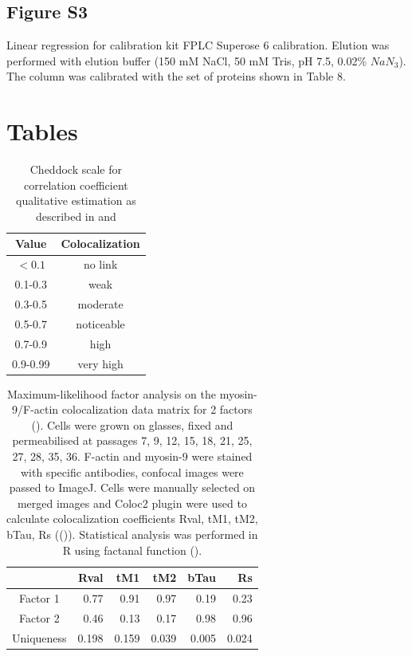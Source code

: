 \documentclass[alpha-refs]{wiley-article}
\begin{document}
\subsection*{Figure S3}

Linear regression for calibration kit FPLC Superose 6 calibration.
Elution was performed with elution buffer (150 mM NaCl, 50 mM Tris, pH 7.5, 0.02\% $NaN_3$).
The column was calibrated with the set of proteins shown in Table 8.



\section*{Tables}

\begin{table}[hb!]
  \caption{Cheddock scale for correlation coefficient qualitative estimation as described in \cite{hinkle2003applied} and \cite{mukaka2012guide}}
\centering
\begin{tabular}{|c|c|}
  Value & Colocalization \\
 \hline
 $ <0.1 $ & no link \\
 0.1-0.3 & weak \\
 0.3-0.5 & moderate \\
 0.5-0.7 & noticeable \\
 0.7-0.9 & high \\
 0.9-0.99 & very high
\end{tabular}
\end{table}

\begin{table}[hbt!]
  \caption{Maximum-likelihood factor analysis on the myosin-9/F-actin colocalization data matrix for 2 factors (\cite{lawley1962factor}). Cells were grown on glasses, fixed and permeabilised at passages 7, 9, 12, 15, 18, 21, 25, 27, 28, 35, 36. F-actin and myosin-9 were stained with specific antibodies, confocal images were passed to ImageJ. Cells were manually selected on merged images and Coloc2 plugin were used to calculate colocalization coefficients Rval, tM1, tM2, bTau, Rs ((\cite{rueden2017imagej2})). Statistical analysis was performed in R using factanal function (\cite{team2014r}).}
\centering
\begin{tabular}{c|rrrrr}
  \hline
  & Rval & tM1 & tM2 & bTau & Rs \\
  \hline
Factor 1 & 0.77 & 0.91 & 0.97 & 0.19 & 0.23 \\
  Factor 2 & 0.46 & 0.13 & 0.17 & 0.98 & 0.96 \\
Uniqueness &  0.198 & 0.159 & 0.039 & 0.005 & 0.024 \\
   \hline
\end{tabular}
\end{table}
\end{document}
